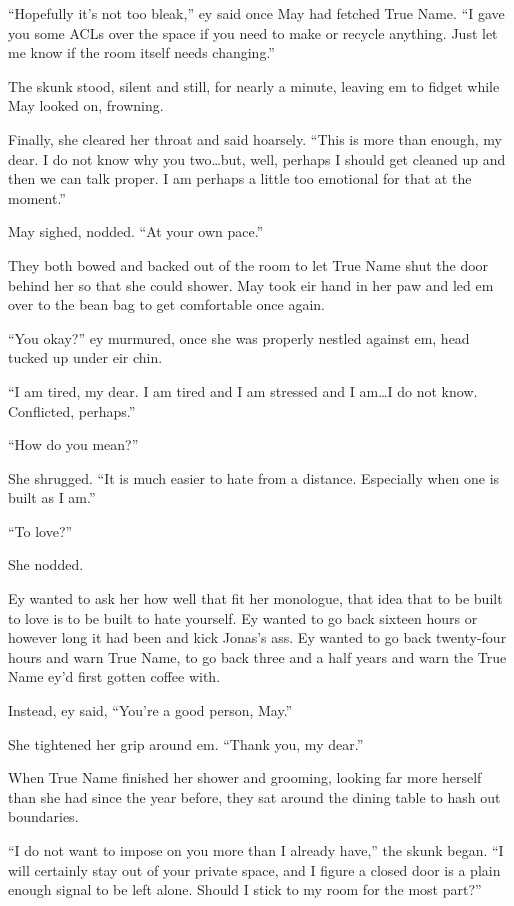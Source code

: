``Hopefully it's not too bleak,'' ey said once May had fetched True Name. ``I gave you some ACLs over the space if you need to make or recycle anything. Just let me know if the room itself needs changing.''

The skunk stood, silent and still, for nearly a minute, leaving em to fidget while May looked on, frowning.

Finally, she cleared her throat and said hoarsely. ``This is more than enough, my dear. I do not know why you two\ldots but, well, perhaps I should get cleaned up and then we can talk proper. I am perhaps a little too emotional for that at the moment.''

May sighed, nodded. ``At your own pace.''

They both bowed and backed out of the room to let True Name shut the door behind her so that she could shower. May took eir hand in her paw and led em over to the bean bag to get comfortable once again.

``You okay?'' ey murmured, once she was properly nestled against em, head tucked up under eir chin.

``I am tired, my dear. I am tired and I am stressed and I am\ldots I do not know. Conflicted, perhaps.''

``How do you mean?''

She shrugged. ``It is much easier to hate from a distance. Especially when one is built as I am.''

``To love?''

She nodded.

Ey wanted to ask her how well that fit her monologue, that idea that to be built to love is to be built to hate yourself. Ey wanted to go back sixteen hours or however long it had been and kick Jonas's ass. Ey wanted to go back twenty-four hours and warn True Name, to go back three and a half years and warn the True Name ey'd first gotten coffee with.

Instead, ey said, ``You're a good person, May.''

She tightened her grip around em. ``Thank you, my dear.''

When True Name finished her shower and grooming, looking far more herself than she had since the year before, they sat around the dining table to hash out boundaries.

``I do not want to impose on you more than I already have,'' the skunk began. ``I will certainly stay out of your private space, and I figure a closed door is a plain enough signal to be left alone. Should I stick to my room for the most part?''

